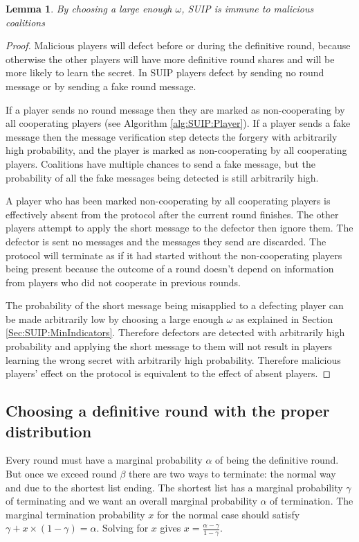 \documentclass{dalcsthesis}
\newtheorem{lemma}{Lemma}
\begin{document}
\begin{lemma} By choosing a large enough $\omega$, SUIP is immune to malicious coalitions \label{Lem:SUIP:MaliciousImmune} \end{lemma}
\begin{proof}
Malicious players will defect before or during the definitive round, because otherwise the other players will have more definitive round shares and will be more likely to learn the secret. In SUIP players defect by sending no round message or by sending a fake round message.

If a player sends no round message then they are marked as non-cooperating by all cooperating players (see Algorithm \ref{alg:SUIP:Player}). If a player sends a fake message then the message verification step detects the forgery with arbitrarily high probability, and the player is marked as non-cooperating by all cooperating players. Coalitions have multiple chances to send a fake message, but the probability of all the fake messages being detected is still arbitrarily high.

A player who has been marked non-cooperating by all cooperating players is effectively absent from the protocol after the current round finishes. The other players attempt to apply the short message to the defector then ignore them. The defector is sent no messages and the messages they send are discarded. The protocol will terminate as if it had started without the non-cooperating players being present because the outcome of a round doesn't depend on information from players who did not cooperate in previous rounds.

The probability of the short message being misapplied to a defecting player can be made arbitrarily low by choosing a large enough $\omega$ as explained in Section \ref{Sec:SUIP:MinIndicators}. Therefore defectors are detected with arbitrarily high probability and applying the short message to them will not result in players learning the wrong secret with arbitrarily high probability. Therefore malicious players' effect on the protocol is equivalent to the effect of absent players.
\end{proof}

\subsection{Choosing a definitive round with the proper distribution}
\label{Sec:SUIP:ChooseRound}

Every round must have a marginal probability $\alpha$ of being the definitive round. But once we exceed round $\beta$ there are two ways to terminate: the normal way and due to the shortest list ending. The shortest list has a marginal probability $\gamma$ of terminating and we want an overall marginal probability $\alpha$ of termination. The marginal termination probability $x$ for the normal case should satisfy $\gamma + x \times (1 - \gamma) = \alpha$. Solving for $x$ gives $x = \frac{\alpha - \gamma}{1 - \gamma}$.
\end{document}
